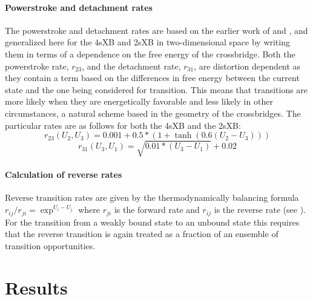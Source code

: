 \documentclass[]{article}
\begin{document}
\paragraph{Powerstroke and detachment rates} %
The powerstroke and detachment rates are based on the earlier work of \citet{Pate1989} and \citet{Tanner:2007:pe115}, and generalized here for the 4sXB and 2sXB in two-dimensional space by writing them in terms of a dependence on the free energy of the crossbridge. 
Both the powerstroke rate, $r_{23}$, and the detachment rate, $r_{31}$, are distortion dependent as they contain a term based on the differences in free energy between the current state and the one being considered for transition. 
This means that transitions are more likely when they are energetically favorable and less likely in other circumstances, a natural scheme based in the geometry of the crossbridges.
The particular rates are as follows for both the 4sXB and the 2sXB:
$$r_{23}(U_2, U_3) = 0.001 + 0.5 * (1 + \tanh(0.6 (U_2 - U_3))) $$
$$r_{31}(U_3, U_1) = \sqrt{0.01 *  (U_3 - U_1)} + 0.02$$

\paragraph{Calculation of reverse rates} %
Reverse transition rates are given by the thermodynamically balancing formula $r_{ij}/r_{ji}=\exp^{U_i-U_j}$ where $r_{ji}$ is the forward rate and $r_{ij}$ is the reverse rate (see \citet{Pate1989, Daniel1998, Tanner:2007:pe115}).
For the transition from a weakly bound state to an unbound state this requires that the reverse transition is again treated as a fraction of an ensemble of transition opportunities.



\section{Results} %

\end{document}
